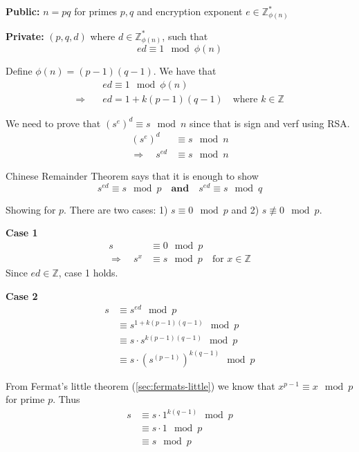 

\textbf{Public:} $n = pq$ for primes $p, q$ and encryption exponent $e
\in \mathbb{Z}_{\phi(n)}^*$

\textbf{Private:} $(p, q, d)$ where $d \in \mathbb{Z}_{\phi(n)}^*$, such that
\[ ed \equiv 1 \mod \phi(n) \]

Define $\phi(n) = (p-1)(q-1)$. We have that
\begin{align*}
  & ed \equiv 1 \mod \phi(n)\\
  \Rightarrow\quad& ed = 1 + k(p - 1)(q - 1) \quad \text{where } k \in \mathbb{Z}
\end{align*}

We need to prove that $(s^e)^d \equiv s \mod n$ since that is sign and verf using RSA.
\begin{align*}
(s^e)^d &\equiv s \mod n \\
\Rightarrow\quad s^{ed} &\equiv s \mod n
\end{align*}

Chinese Remainder Theorem says that it is enough to show
\[ s^{ed} \equiv s \mod p \quad \textbf{and} \quad s^{ed} \equiv s \mod q \]

Showing for $p$. There are two cases: 1) $s \equiv 0 \mod p$ and 2) $s \not\equiv 0 \mod p$.

\textbf{Case 1}
\begin{align*}
  s &\equiv 0 \mod p\\
  \Rightarrow\quad s^x &\equiv s \mod p \quad \text{for } x \in \mathbb{Z}
\end{align*}
Since $ed \in \mathbb{Z}$, case 1 holds.

\textbf{Case 2}
\begin{align*}
s &\equiv s^{ed} \mod p \\
  &\equiv s^{1 + k(p-1)(q-1)} \mod p \\
  &\equiv s \cdot s^{k(p-1)(q-1)} \mod p \\
  &\equiv s \cdot (s^{(p-1)})^{k(q-1)} \mod p
\end{align*}

From Fermat's little theorem (\ref{sec:fermats-little}) we know that
$x^{p-1} \equiv x \mod p$ for prime $p$. Thus
\begin{align*}
s &\equiv s \cdot 1^{k(q-1)} \mod p \\
  &\equiv s \cdot 1 \mod p \\
  &\equiv s \mod p
\end{align*}
